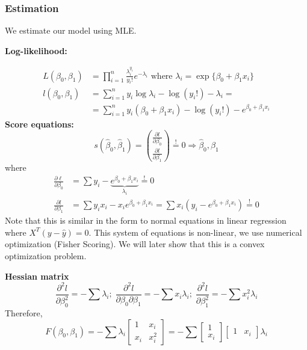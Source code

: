 \documentclass[11pt, %
	oneside, %
	english, %
	onehalfspacing, %
	]{article} %
\numberwithin{equation}{section}
\begin{document}
\subsubsection*{Estimation}

We estimate our model using MLE.

\textbf{Log-likelihood:}

$$
\begin{aligned}
L\left(\beta_0, \beta_1\right) & =\prod_{i=1}^n \frac{\lambda_i^{y_i}}{y_{i}!} e^{-\lambda_i} \text { where } \lambda_i=\exp \{\beta_0+\beta_1 x_i\} \\
l\left(\beta_0, \beta_1\right) & =\sum_{i=1}^n y_i \log \lambda_i-\log (y_{i}!)-\lambda_i= \\
& =\sum_{i=1}^n y_i\left(\beta_0+\beta_1 x_i\right)-\log (y_{i}!)-e^{\beta_0+\beta_1 x_i}
\end{aligned}
$$
\textbf{Score equations:}
$$
s\left(\hat{\beta}_0, \hat{\beta}_1\right)=\binom{\frac{\partial l}{\partial \beta_0}}{\frac{\partial l}{\partial \beta_1}} \stackrel{!}{=} 0 \Rightarrow \hat{\beta}_0, \hat{\beta}_1
$$
where
$$
\begin{aligned}
\frac{\partial \ell}{\partial \beta_0}&=\sum y_i-\underbrace{e^{\beta_0+\beta_1 x_i}}_{\lambda_i} \stackrel{!}{=} 0 \\
\frac{\partial l}{\partial \beta_1}&=\sum y_i x_i-x_i e^{\beta_0+\beta_1 x_i}=\sum x_i(y_i-e^{\beta_0+\beta_1 x_i}) \stackrel{!}{=} 0
\end{aligned}
$$
Note that this is similar in the form to normal equations in linear regression where $X^T(y- \hat{y}) = 0$. This system of equations is non-linear, we use numerical optimization (Fisher Scoring). We will later show that this is a convex optimization problem.

\textbf{Hessian matrix}
$$
\frac{\partial^2 l}{\partial \beta_0^2}=-\sum \lambda_i; \; \frac{\partial^2 l}{\partial \beta_0 \partial \beta_1}=-\sum x_i \lambda_i ; \; \frac{\partial^2 l}{\partial \beta_1^2}=-\sum x_i^2 \lambda_i
$$
Therefore,
$$
F(\beta_0, \beta_1) = - \sum \lambda_i \begin{bmatrix}
1 & x_i  \\
x_i  & x_i^2
\end{bmatrix}
=
- \sum
\begin{bmatrix}
1 \\
x_i
\end{bmatrix}
\begin{bmatrix}
1  & x_i
\end{bmatrix}
\lambda_i
$$
\end{document}
